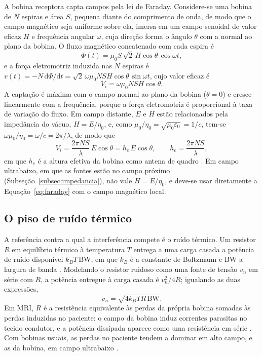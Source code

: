 \documentclass[portuguese]{sbcreviews-2025}%
\begin{document}
A bobina receptora capta campos pela lei de Faraday. Considere-se uma bobina de $N$ espiras e área $S$, pequena diante do comprimento de onda, de modo que o campo magnético seja uniforme sobre ela, imersa em um campo senoidal de valor eficaz $H$ e frequência angular $\omega$, cuja direção forma o ângulo $\theta$ com a normal ao plano da bobina. O fluxo magnético concatenado com cada espira é
\begin{equation}
\Phi(t) = \mu_0 S\,\sqrt{2}\,H\cos\theta\,\cos\omega t,
\label{eq:fluxo}
\end{equation}
e a força eletromotriz induzida nas $N$ espiras é $v(t) = -N\,\mathrm{d}\Phi/\mathrm{d}t = \sqrt{2}\,\omega\mu_0 N S H\cos\theta\,\sin\omega t$, cujo valor eficaz é
\begin{equation}
V_i = \omega\mu_0 N S H\cos\theta.
\label{eq:faraday}
\end{equation}
A captação é máxima com o campo normal ao plano da bobina ($\theta = 0$) e cresce linearmente com a frequência, porque a força eletromotriz é proporcional à taxa de variação do fluxo. Em campo distante, $E$ e $H$ estão relacionados pela impedância do vácuo, $H = E/\eta_0$, e, como $\mu_0/\eta_0 = \sqrt{\mu_0\varepsilon_0} = 1/c$, tem-se $\omega\mu_0/\eta_0 = \omega/c = 2\pi/\lambda$, de modo que
\begin{equation}
V_i = \frac{2\pi N S}{\lambda}\,E\cos\theta = h_e\,E\cos\theta, \qquad h_e = \frac{2\pi N S}{\lambda},
\label{eq:captacao}
\end{equation}
em que $h_e$ é a altura efetiva da bobina como antena de quadro \citep{balanis2016}. Em campo ultrabaixo, em que as fontes estão no campo próximo (Subseção~\ref{subsec:impedancia}), não vale $H = E/\eta_0$, e deve-se usar diretamente a Equação~\eqref{eq:faraday} com o campo magnético local.

\subsection{O piso de ruído térmico}
\label{subsec:ruido}

A referência contra a qual a interferência compete é o ruído térmico. Um resistor $R$ em equilíbrio térmico à temperatura $T$ entrega a uma carga casada a potência de ruído disponível $k_B T\,\mathrm{BW}$, em que $k_B$ é a constante de Boltzmann e $\mathrm{BW}$ a largura de banda \citep{nyquist1928}. Modelando o resistor ruidoso como uma fonte de tensão $v_n$ em série com $R$, a potência entregue à carga casada é $v_n^2/4R$; igualando as duas expressões,
\begin{equation}
v_n = \sqrt{4 k_B T R\,\mathrm{BW}}.
\label{eq:ruido}
\end{equation}
Em MRI, $R$ é a resistência equivalente às perdas da própria bobina somadas às perdas induzidas no paciente: o campo da bobina induz correntes parasitas no tecido condutor, e a potência dissipada aparece como uma resistência em série \citep{hoult1976}. Com bobinas usuais, as perdas no paciente tendem a dominar em alto campo, e as da bobina, em campo ultrabaixo \citep{hoult1976, marques2019lowfield}.
\end{document}
